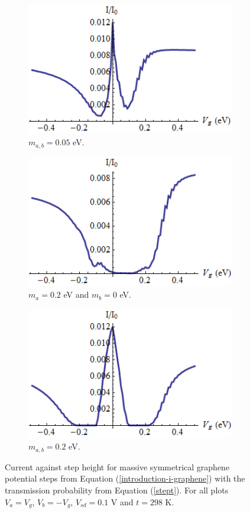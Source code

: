 		\begin{figure}[h]
			 \begin{subfigure}[h]{0.3\textwidth}
				\centerline{\includegraphics[scale=0.35]{images/step-vgm-1}}
				\caption{ $m_{a,b}=0.05$ eV.}
			\end{subfigure}
			\hspace{0.5cm}
			\begin{subfigure}[h]{0.3\textwidth}
				\centerline{\includegraphics[scale=0.35]{images/step-vgm-2}}
				\caption{$m_{a}=0.2$ eV and $m_{b}=0$ eV.}
			\end{subfigure}
			\hspace{0.5cm}
			\begin{subfigure}[h]{0.3\textwidth}
				\centerline{\includegraphics[scale=0.35]{images/step-vgm-3}}
				\caption{$m_{a,b}=0.2$ eV.}
			\end{subfigure}
			\caption{Current against step height for massive symmetrical graphene potential steps from Equation (\ref{introduction-i-graphene}) with the transmission probability from Equation (\ref{stept}). For all plots $V_{a}=V_{g}$, $V_{b}=-V_{g}$, $V_{sd}=0.1$ V and $t=298$ K.}
			\label{step-ivg-m}
		\end{figure}

